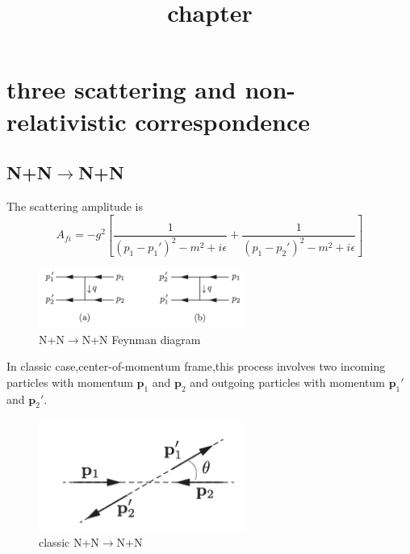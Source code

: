 \documentclass[a4paper]{article}
\begin{document}
	\title{chapter}
	\date{ }
	\maketitle
\section{three scattering and non-relativistic correspondence}
\subsection{N+N$\rightarrow$N+N}
The scattering amplitude is$$A_{fi}=-g^2[\frac{1}{(p_1-p_1')^2-m^2+i\epsilon}+\frac{1}{(p_1-p_2')^2-m^2+i\epsilon}]$$
\begin{figure}[htbp]
	\centering
	\includegraphics[width=0.6\textwidth]{7.png}
	\caption{N+N$\rightarrow$N+N Feynman diagram}
\end{figure}
In classic case,center-of-momentum frame,this process involves two incoming particles with momentum $\bm{p}_1$ and $\bm{p}_2$ and outgoing particles with momentum $\bm{p}_1'$ and $\bm{p}_2'$.
\begin{figure}[htbp]
	\centering
	\includegraphics[width=0.6\textwidth]{8.png}
	\caption{classic N+N$\rightarrow$N+N}
\end{figure}
\end{document}
